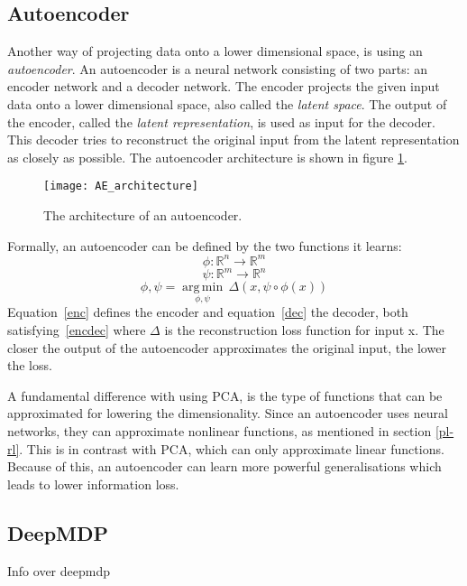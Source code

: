 \subsection{Autoencoder}\label{pl-ae}
Another way of projecting data onto a lower dimensional space, is using an \emph{autoencoder}\cite{AE_general}. An autoencoder is a neural network consisting of two parts: an encoder network and a decoder network. The encoder projects the given input data onto a lower dimensional space, also called the \emph{latent space}. The output of the encoder, called the \emph{latent representation}, is used as input for the decoder. This decoder tries to reconstruct the original input from the latent representation as closely as possible. The autoencoder architecture is shown in figure \ref{fig:AE_architecture}.

\begin{figure}[h]
    \centering
    \texttt{[image: AE\_architecture]}
    \caption{The architecture of an autoencoder.}
    \label{fig:AE_architecture}
\end{figure}

Formally, an autoencoder can be defined by the two functions it learns: 
\begin{equation}
  \label{enc}
  \phi :{\mathbb{R}^n}\rightarrow {\mathbb{R}^m}
\end{equation}
\begin{equation}
  \label{dec}
  \psi :{\mathbb{R}^m}\rightarrow {\mathbb{R}^n}
\end{equation}
\begin{equation}
  \label{encdec}
  \phi ,\psi ={\underset {\phi ,\psi }{\operatorname {arg\,min} }}\,{\Delta}(x, \psi \circ \phi (x))
\end{equation}
Equation~\eqref{enc} defines the encoder and equation~\eqref{dec} the decoder, both satisfying~\eqref{encdec} where $\Delta$ is the reconstruction loss function for input x. The closer the output of the autoencoder approximates the original input, the lower the loss.

A fundamental difference with using PCA, is the type of functions that can be approximated for lowering the dimensionality. Since an autoencoder uses neural networks, they can approximate nonlinear functions, as mentioned in section \ref{pl-rl}. This is in contrast with PCA, which can only approximate linear functions. Because of this, an autoencoder can learn more powerful generalisations which leads to lower information loss\cite{AE_general}.

\subsection{DeepMDP}\label{pl-deepmdp}
Info over deepmdp

